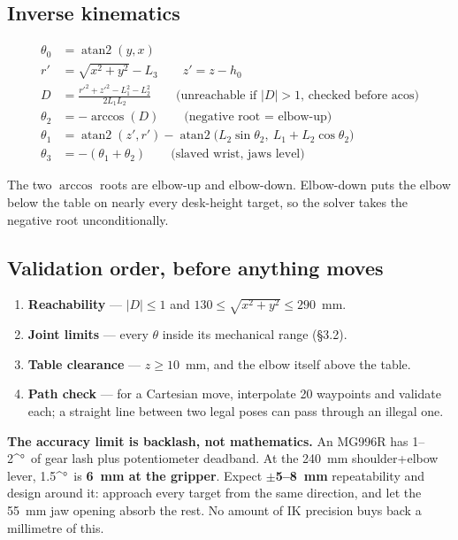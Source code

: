 \documentclass[11pt]{article}
\newcommand{\degsym}{\ifmmode{}^{\circ}\else°\fi}
\begin{document}
\subsection{Inverse kinematics}
\begin{align*}
\theta_0 &= \operatorname{atan2}(y, x) \\[2pt]
r' &= \sqrt{x^2+y^2} - L_3 \qquad z' = z - h_0 \\[2pt]
D &= \frac{r'^2 + z'^2 - L_1^2 - L_2^2}{2 L_1 L_2} \qquad \text{(unreachable if } |D| > 1\text{, checked before acos)} \\[2pt]
\theta_2 &= -\arccos(D) \qquad \text{(negative root = elbow-up)} \\[2pt]
\theta_1 &= \operatorname{atan2}(z', r') - \operatorname{atan2}\!\big(L_2\sin\theta_2,\ L_1+L_2\cos\theta_2\big) \\[2pt]
\theta_3 &= -(\theta_1+\theta_2) \qquad \text{(slaved wrist, jaws level)}
\end{align*}

The two $\arccos$ roots are elbow-up and elbow-down. Elbow-down puts the elbow below the table on nearly every desk-height target, so the solver takes the negative root unconditionally.

\subsection{Validation order, before anything moves}
\begin{enumerate}
\item \textbf{Reachability} --- $|D|\leq 1$ and $130 \leq \sqrt{x^2+y^2} \leq 290$~mm.
\item \textbf{Joint limits} --- every $\theta$ inside its mechanical range (\S3.2).
\item \textbf{Table clearance} --- $z \geq 10$~mm, and the elbow itself above the table.
\item \textbf{Path check} --- for a Cartesian move, interpolate 20 waypoints and validate each; a straight line between two legal poses can pass through an illegal one.
\end{enumerate}

\textbf{The accuracy limit is backlash, not mathematics.} An MG996R has 1--2\degsym\ of gear lash plus potentiometer deadband. At the 240~mm shoulder+elbow lever, 1.5\degsym\ is \textbf{6~mm at the gripper}. Expect \textbf{$\pm$5--8~mm} repeatability and design around it: approach every target from the same direction, and let the 55~mm jaw opening absorb the rest. No amount of IK precision buys back a millimetre of this.
\end{document}
